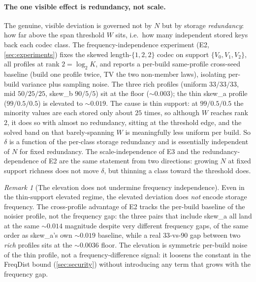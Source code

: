 \documentclass[11pt]{article}
\theoremstyle{definition}
\theoremstyle{plain}
\theoremstyle{remark}
\newtheorem{remark}{Remark}[section]
\newcommand{\W}{W}                          %
\begin{document}
\paragraph{The one visible effect is redundancy, not scale.}
The genuine, visible deviation is governed not by $N$ but by storage
\emph{redundancy}: how far above the span threshold $\W$ sits, i.e.\ how many independent
stored keys back each codec class. The frequency-independence experiment (E2,
\cref{sec:experiments}) fixes the skewed length-$\{1,2,2\}$ codec on support
$\{V_0, V_1, V_2\}$, all profiles at rank $2 = \log_2 K$, and reports a per-build
same-profile cross-seed baseline (build one profile twice, TV the two non-member laws),
isolating per-build variance plus sampling noise. The three rich profiles (uniform
$33/33/33$, mid $50/25/25$, skew\_b $90/5/5$) sit at the floor ($\sim 0.003$); the thin
skew\_a profile ($99/0.5/0.5$) is elevated to $\sim 0.019$. The cause is thin support:
at $99/0.5/0.5$ the minority values are each stored only about $25$ times, so although
$\W$ reaches rank $2$, it does so with almost no redundancy, sitting at the threshold
edge, and the solved band on that barely-spanning $\W$ is meaningfully less uniform per
build. So $\delta$ is a function of the per-class storage redundancy and is essentially
independent of $N$ for fixed redundancy. The scale-independence of E3 and the
redundancy-dependence of E2 are the same statement from two directions: growing $N$ at
fixed support richness does not move $\delta$, but thinning a class toward the threshold
does.

\begin{remark}[The elevation does not undermine frequency independence]
\label{rem:elevation}
Even in the thin-support elevated regime, the elevated deviation does \emph{not} encode
storage frequency. The cross-profile advantage of E2 tracks the per-build baseline of
the noisier profile, not the frequency gap: the three pairs that include skew\_a all land
at the same $\sim 0.014$ magnitude despite very different frequency gaps, of the same
order as skew\_a's own $\sim 0.019$ baseline, while a real $33$-vs-$90$ gap between two
\emph{rich} profiles sits at the $\sim 0.0036$ floor. The elevation is symmetric
per-build noise of the thin profile, not a frequency-difference signal: it loosens the
constant in the FreqDist bound (\cref{sec:security}) without introducing any term that
grows with the frequency gap.
\end{remark}
\end{document}
